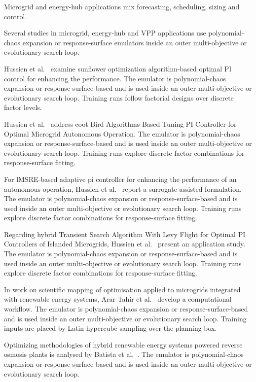 Microgrid and energy-hub applications mix forecasting, scheduling, sizing and control.

Several studies in microgrid, energy-hub and VPP applications use polynomial-chaos expansion or response-surface emulators inside an outer multi-objective or evolutionary search loop.

Hussien et al.~\cite{Hussien20211883} examine sunflower optimization algorithm-based optimal PI control for enhancing the performance. The emulator is polynomial-chaos expansion or response-surface-based and is used inside an outer multi-objective or evolutionary search loop. Training runs follow factorial designs over discrete factor levels.

Hussien et al.~\cite{Hussien20226442} address coot Bird Algorithms-Based Tuning PI Controller for Optimal Microgrid Autonomous Operation. The emulator is polynomial-chaos expansion or response-surface-based and is used inside an outer multi-objective or evolutionary search loop. Training runs explore discrete factor combinations for response-surface fitting.

For lMSRE-based adaptive pi controller for enhancing the performance of an autonomous operation, Hussien et al.~\cite{Hussien202190577} report a surrogate-assisted formulation. The emulator is polynomial-chaos expansion or response-surface-based and is used inside an outer multi-objective or evolutionary search loop. Training runs explore discrete factor combinations for response-surface fitting.

Regarding hybrid Transient Search Algorithm With Levy Flight for Optimal PI Controllers of Islanded Microgrids, Hussien et al.~\cite{Hussien202415075} present an application study. The emulator is polynomial-chaos expansion or response-surface-based and is used inside an outer multi-objective or evolutionary search loop. Training runs explore discrete factor combinations for response-surface fitting.

In work on scientific mapping of optimisation applied to microgrids integrated with renewable energy systems, Arar Tahir et al.~\cite{arar_tahir_scientific_2023} develop a computational workflow. The emulator is polynomial-chaos expansion or response-surface-based and is used inside an outer multi-objective or evolutionary search loop. Training inputs are placed by Latin hypercube sampling over the planning box.

Optimizing methodologies of hybrid renewable energy systems powered reverse osmosis plants is analysed by Batista et al.~\cite{batista_optimizing_2023}. The emulator is polynomial-chaos expansion or response-surface-based and is used inside an outer multi-objective or evolutionary search loop.

